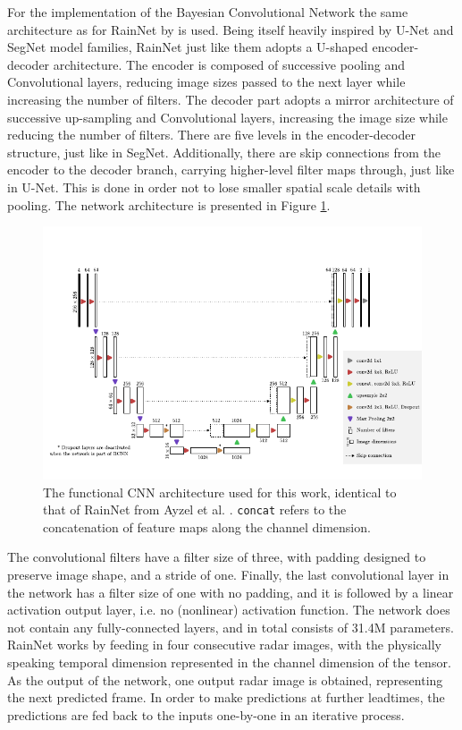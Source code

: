 For the implementation of the Bayesian Convolutional Network the same architecture as for RainNet by \citet{ayzel_rainnet_nodate} is used. Being itself heavily inspired by U-Net and SegNet model families, RainNet just like them adopts a U-shaped encoder-decoder architecture. The encoder is composed of successive pooling and Convolutional layers, reducing image sizes passed to the next layer while increasing the number of filters. The decoder part adopts a mirror architecture of successive up-sampling and Convolutional layers, increasing the image size while reducing the number of filters. There are five levels in the encoder-decoder structure, just like in SegNet. Additionally, there are skip connections from the encoder to the decoder branch, carrying higher-level filter maps through, just like in U-Net. This is done in order not to lose smaller spatial scale details with pooling. The network architecture is presented in Figure \ref{fig:rainnet}.

\begin{figure}[h]
	\centering
	\includegraphics[scale=1]{images/rainnet_arch/rainnet_arch}
	\caption{The functional CNN architecture used for this work, identical to that of RainNet from Ayzel et al. \cite{ayzel_rainnet_nodate}. \texttt{concat} refers to the concatenation of feature maps along the channel dimension.}
	\label{fig:rainnet}
\end{figure}

The convolutional filters have a filter size of three, with padding designed to preserve image shape, and a stride of one. Finally, the last convolutional layer in the network has a filter size of one with no padding, and it is followed by a linear activation output layer, i.e. no (nonlinear) activation function. The network does not contain any fully-connected layers, and in total consists of 31.4M parameters. RainNet works by feeding in four consecutive radar images, with the physically speaking temporal dimension represented in the channel dimension of the tensor. As the output of the network, one output radar image is obtained, representing the next predicted frame. In order to make predictions at further leadtimes, the predictions are fed back to the inputs one-by-one in an iterative process. 

